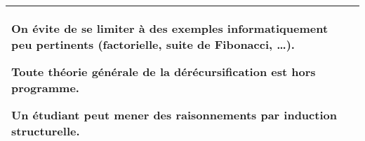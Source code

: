 \begin{longtable}{|p{\lnotion}|p{\comment}|}
{    On évite de se limiter à des exemples informatiquement peu pertinents (factorielle, suite de Fibonacci, \dots). 
    
    Toute théorie générale de la dérécursification est hors programme.
    
    Un étudiant peut mener des raisonnements par induction structurelle.
    } \\
    \hline
\end{longtable}


